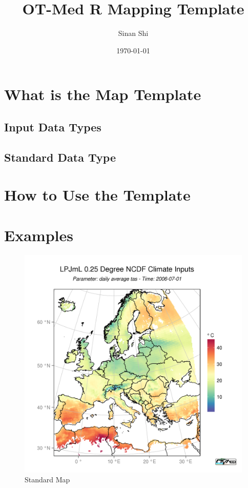 \documentclass[a4paper,10pt]{article}
\title{OT-Med R Mapping Template}
\author{Sinan Shi}
\date{\today}
\begin{document}
\maketitle
\tableofcontents
\section{What is the Map Template}
\subsection{Input Data Types}

\subsection{Standard Data Type}





\section{How to Use the Template}
\section{Examples}
\begin{figure}
  \centering
    \includegraphics[width=1\textwidth]{first}
  \caption{Standard Map}
  \label{fig:gull}
\end{figure}
\end{document}
